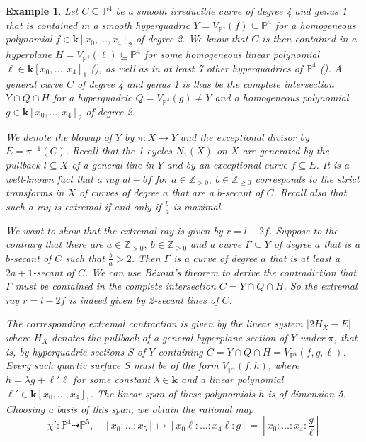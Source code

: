 \documentclass[english,11pt,reqno]{amsart}
\newcommand{\sub}{\subseteq}
\newcommand{\Pfour}{\mathbb{P}^4}
\newcommand{\Pfive}{\mathbb{P}^5}
\newcommand{\VPfour}{V_{\Pfour}}
\newcommand{\kk}{\mathbf{k}}
\newcommand{\kPfour}{\kk[x_0,\dots,x_4]}
\newcommand{\Z}{\mathbb{Z}}
\newtheorem{ex}[thm]{Example}
\begin{document}
\begin{ex} \label{ex:Sarkisov_link_1_4}
Let $C\sub \Pfour$ be a smooth irreducible curve of degree 4 and genus 1 that is contained in a smooth hyperquadric $Y=\VPfour(f)\sub \Pfour$ for a homogeneous polynomial $f\in\kPfour_2$ of degree 2. We know that $C$ is then contained in a hyperplane $H=\VPfour(\ell)\sub \Pfour$ for some homogeneous linear polynomial $\ell\in\kPfour_1$ (), as well as in at least 7 other hyperquadrics of $\Pfour$ (). A general curve $C$ of degree 4 and genus 1 is thus be the complete intersection $Y\cap Q\cap H$ for a hyperquadric $Q=\VPfour(g)\neq Y$ and a homogeneous polynomial $g\in\kPfour_2$ of degree 2. \par 
We denote the blowup of $Y$ by $\pi:X\rightarrow Y$ and the exceptional divisor by $E=\pi^{-1}(C)$. Recall that the 1-cycles $N_1(X)$ on $X$ are generated by the pullback $l\sub X$ of a general line in $Y$ and by an exceptional curve $f\sub E$. It is a well-known fact that a ray $al-bf$ for $a\in\Z_{>0},\: b\in \Z_{\geq 0}$ corresponds to the strict transforms in $X$ of curves of degree $a$ that are a $b$-secant of $C$. Recall also that such a ray is extremal if and only if $\frac{b}{a}$ is maximal. \par 
We want to show that the extremal ray is given by $r=l-2f$. Suppose to the contrary that there are  $a\in\Z_{>0},\: b\in \Z_{\geq 0}$ and a curve $\Gamma \sub Y$ of degree $a$ that is a $b$-secant of $C$ such that $\frac{b}{a}> 2$. Then $\Gamma$ is a curve of degree $a$ that is at least a $2a+1$-secant of $C$. We can use Bézout's theorem to derive the contradiction that $\Gamma$ must be contained in the complete intersection $C=Y\cap Q\cap H$. So the extremal ray $r=l-2f$ is indeed given by 2-secant lines of $C$. \par 
The corresponding extremal contraction is given by the linear system $|2H_X-E|$ where $H_X$ denotes the pullback of a general hyperplane section of $Y$ under $\pi$, that is, by hyperquadric sections $S$ of $Y$ containing $C=Y\cap Q\cap H=\VPfour(f,g,\ell)$. Every such quartic surface $S$ must be of the form $\VPfour(f,h)$, where $h=\lambda g + \ell' \ell$ for some constant $\lambda\in\kk$ and a linear polynomial $\ell'\in\kPfour_1$. The linear span of these polynomials $h$ is of dimension 5. Choosing a basis of this span, we obtain the rational map
$$ \chi': \Pfour \dashrightarrow \Pfive,\quad [x_0:{\dots}:x_5 ]\mapsto [x_0\ell:{\dots}:x_4\ell:g]=\left[x_0:{\dots}:x_4:\frac{g}{\ell}\right]$$

\end{ex}
\end{document}
